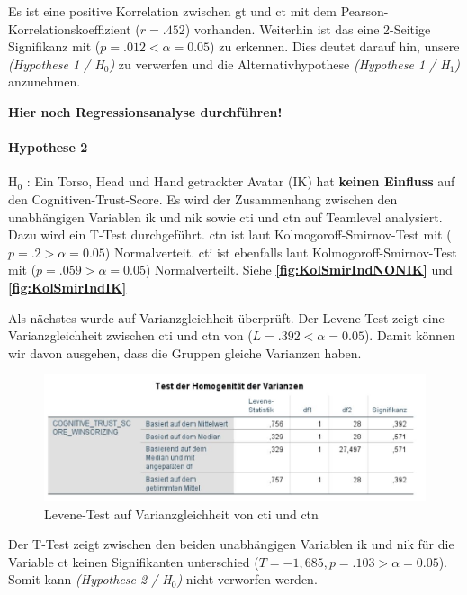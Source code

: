 \documentclass[a4paper,11pt]{article}%
\renewcommand{\\}{\vspace*{0.5\baselineskip} \newline}
\begin{document}
Es ist eine positive Korrelation zwischen \ac{gt} und \ac{ct} mit dem Pearson-Korrelationskoeffizient ($r = .452$) vorhanden. Weiterhin ist das eine 2-Seitige Signifikanz mit ($p = .012 < \alpha = 0.05$) zu erkennen. Dies deutet darauf hin, unsere \textit{(Hypothese 1 / H$_{0}$)} zu verwerfen und die Alternativhypothese \textit{(Hypothese 1 / H$_{1}$)} anzunehmen.

\textbf{Hier noch Regressionsanalyse durchführen!}
\newpage
\paragraph{Hypothese 2}
H$_{0}$ : Ein Torso, Head und Hand getrackter Avatar (IK) hat \textbf{keinen Einfluss} auf den Cognitiven-Trust-Score.\\
Es wird der Zusammenhang zwischen den unabhängigen Variablen \ac{ik} und \ac{nik} sowie \ac{cti} und \ac{ctn} auf Teamlevel analysiert. Dazu wird ein T-Test durchgeführt.
\ac{ctn} ist laut Kolmogoroff-Smirnov-Test mit ($p = .2 > \alpha = 0.05$) Normalverteit. \ac{cti} ist ebenfalls laut Kolmogoroff-Smirnov-Test mit ($p = .059 > \alpha = 0.05$) Normalverteilt. Siehe \textbf{\autoref{fig:KolSmirIndNONIK}} und \textbf{\autoref{fig:KolSmirIndIK}}

Als nächstes wurde auf Varianzgleichheit überprüft. Der Levene-Test zeigt eine Varianzgleichheit zwischen \ac{cti} und \ac{ctn} von ($L = .392 < \alpha = 0.05$). Damit können wir davon ausgehen, dass die Gruppen gleiche Varianzen haben.

\begin{figure}[H]
\centering
		\begin{footnotesize}
			\includegraphics[scale=0.8]{Abbildungen/Post_QuestionnaireStatistiks/Varianzgleichheit_Levene_cti_ctn}
			\caption{Levene-Test auf Varianzgleichheit von \ac{cti} und \ac{ctn}}
			\label{fig:Varianzgleichheit_Levene_gt_ct}
		\end{footnotesize}
	\end{figure}	


Der T-Test zeigt zwischen den beiden unabhängigen Variablen \ac{ik} und \ac{nik} für die Variable \ac{ct} keinen Signifikanten unterschied ($T = -1,685 , p = .103 > \alpha = 0.05$).  Somit kann \textit{(Hypothese 2 / H$_{0}$)} nicht verworfen werden.
\end{document}
